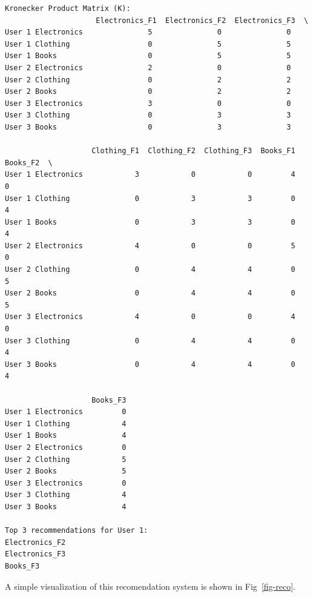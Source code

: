 \documentclass[
  letterpaper,
  DIV=11,
  numbers=noendperiod]{scrreprt}
\theoremstyle{plain}
\theoremstyle{definition}
\theoremstyle{remark}
\begin{document}
\begin{verbatim}
Kronecker Product Matrix (K):
                     Electronics_F1  Electronics_F2  Electronics_F3  \
User 1 Electronics               5               0               0   
User 1 Clothing                  0               5               5   
User 1 Books                     0               5               5   
User 2 Electronics               2               0               0   
User 2 Clothing                  0               2               2   
User 2 Books                     0               2               2   
User 3 Electronics               3               0               0   
User 3 Clothing                  0               3               3   
User 3 Books                     0               3               3   

                    Clothing_F1  Clothing_F2  Clothing_F3  Books_F1  Books_F2  \
User 1 Electronics            3            0            0         4         0   
User 1 Clothing               0            3            3         0         4   
User 1 Books                  0            3            3         0         4   
User 2 Electronics            4            0            0         5         0   
User 2 Clothing               0            4            4         0         5   
User 2 Books                  0            4            4         0         5   
User 3 Electronics            4            0            0         4         0   
User 3 Clothing               0            4            4         0         4   
User 3 Books                  0            4            4         0         4   

                    Books_F3  
User 1 Electronics         0  
User 1 Clothing            4  
User 1 Books               4  
User 2 Electronics         0  
User 2 Clothing            5  
User 2 Books               5  
User 3 Electronics         0  
User 3 Clothing            4  
User 3 Books               4  

Top 3 recommendations for User 1:
Electronics_F2
Electronics_F3
Books_F3
\end{verbatim}

A simple visualization of this recomendation system is shown in
Fig~\ref{fig-reco}.
\end{document}
